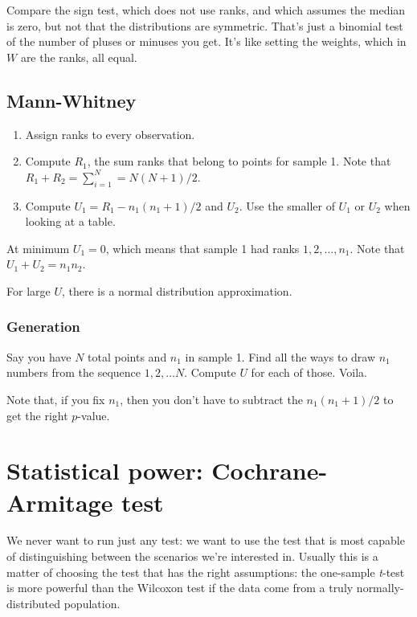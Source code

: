 Compare the sign test, which does not use ranks, and which assumes the
median is zero, but not that the distributions are symmetric. That's
just a binomial test of the number of pluses or minuses you get. It's
like setting the weights, which in \(W\) are the ranks, all equal.

\subsection{Mann-Whitney}\label{mann-whitney}

\begin{enumerate}
\def\labelenumi{\arabic{enumi}.}
\tightlist
\item
  Assign ranks to every observation.
\item
  Compute \(R_1\), the sum ranks that belong to points for sample 1.
  Note that \(R_1 + R_2 = \sum_{i=1}^N = N(N+1)/2\).
\item
  Compute \(U_1 = R_1 - n_1(n_1+1)/2\) and \(U_2\). Use the smaller of
  \(U_1\) or \(U_2\) when looking at a table.
\end{enumerate}

At minimum \(U_1 = 0\), which means that sample 1 had ranks
\(1,2,\ldots,n_1\). Note that \(U_1 + U_2 = n_1 n_2\).

For large \(U\), there is a normal distribution approximation.

\subsubsection{Generation}\label{generation}

Say you have \(N\) total points and \(n_1\) in sample 1. Find all the
ways to draw \(n_1\) numbers from the sequence \(1, 2, \ldots N\).
Compute \(U\) for each of those. Voila.

Note that, if you fix \(n_1\), then you don't have to subtract the
\(n_1(n_1+1)/2\) to get the right \(p\)-value.

\section{Statistical power: Cochrane-Armitage
test}\label{statistical-power-cochrane-armitage-test}

We never want to run just any test: we want to use the test that is most
capable of distinguishing between the scenarios we're interested in.
Usually this is a matter of choosing the test that has the right
assumptions: the one-sample \emph{t}-test is more powerful than the
Wilcoxon test if the data come from a truly normally-distributed
population.

